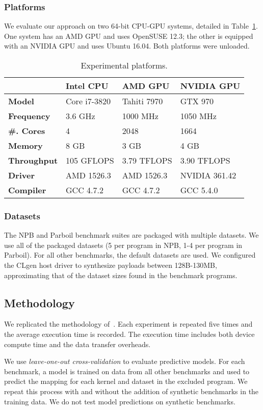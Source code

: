 \subsubsection{Platforms} We evaluate our approach on two 64-bit CPU-GPU systems, detailed in Table~\ref{tab:platforms}. One system has an AMD GPU and uses OpenSUSE 12.3; the other is equipped with an NVIDIA GPU and uses Ubuntu 16.04. Both platforms were unloaded.

\begin{table}%
  \centering %
  \begin{tabular}{l l l l}
    \toprule
    & \textbf{Intel CPU} & \textbf{AMD GPU} & \textbf{NVIDIA GPU} \\
    \midrule
    \textbf{Model} & Core i7-3820 & Tahiti 7970 & GTX 970 \\
    \textbf{Frequency} & 3.6 GHz & 1000 MHz & 1050 MHz \\
    \textbf{\#. Cores} & 4 & 2048 & 1664 \\
    \textbf{Memory} & 8 GB & 3 GB & 4 GB \\
    \textbf{Throughput} & 105 GFLOPS & 3.79 TFLOPS & 3.90 TFLOPS \\
    \textbf{Driver} & AMD 1526.3 & AMD 1526.3 & NVIDIA 361.42 \\
    \textbf{Compiler} & GCC 4.7.2 & GCC 4.7.2 & GCC 5.4.0 \\
  \end{tabular}
  \caption{Experimental platforms.}
  \label{tab:platforms}
\end{table}

\subsubsection{Datasets} The NPB and Parboil benchmark suites are packaged with multiple datasets. We use all of the packaged datasets (5 per program in NPB, 1-4 per program in Parboil). For all other benchmarks, the default datasets are used. We configured the CLgen host driver to synthesize payloads between 128B-130MB, approximating that of the dataset sizes found in the benchmark programs.


\subsection{Methodology}

We replicated the methodology of~\cite{Grewe2013}. Each experiment is repeated five times and the average execution time is recorded. The execution time includes both device compute time and the data transfer overheads.

We use \emph{leave-one-out cross-validation} to evaluate predictive models. For each benchmark, a model is trained on data from all other benchmarks and used to predict the mapping for each kernel and dataset in the excluded program. We repeat this process with and without the addition of synthetic benchmarks in the training data. We do not test model predictions on synthetic benchmarks.
